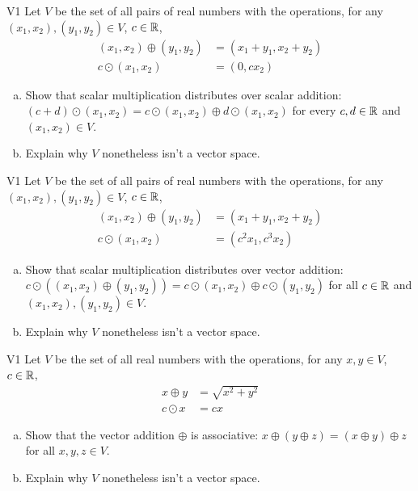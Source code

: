 \begin{problem}{V1}
Let \(V\) be the set of all pairs of real numbers with the operations, for any \((x_1,x_2), (y_1,y_2) \in V\), \(c\in \mathbb{R}\),
\begin{align*}
(x_1,x_2) \oplus (y_1,y_2) &= (x_1+y_1,x_2+y_2) \\
c \odot (x_1,x_2) &= (0, cx_2)
\end{align*}
\begin{enumerate}[(a)]
\item Show that scalar multiplication distributes over scalar addition:
      \((c+d)\odot(x_1,x_2)=c\odot(x_1,x_2) \oplus d\odot(x_1,x_2)\) for every \(c,d \in \mathbb{R}\) and \( (x_1,x_2) \in V\).
\item Explain why \(V\) nonetheless isn't a vector space.
\end{enumerate}
\end{problem}


 \begin{problem}{V1}
 Let \(V\) be the set of all pairs of real numbers with the operations, for any \((x_1,x_2), (y_1,y_2) \in V\), \(c\in \mathbb{R}\),
 \begin{align*}
 (x_1,x_2) \oplus (y_1,y_2) &= (x_1+y_1,x_2+y_2) \\
 c \odot (x_1,x_2) &= (c^2x_1, c^3x_2)
 \end{align*}
 \begin{enumerate}[(a)]
 \item Show that scalar multiplication distributes over vector addition:
       \(c\odot((x_1,x_2) \oplus (y_1,y_2))=c\odot(x_1,x_2) \oplus c\odot(y_1,y_2)\) for all \(c \in \mathbb{R}\) and \( (x_1,x_2), (y_1,y_2) \in V\).
\item Explain why \(V\) nonetheless isn't a vector space.
 \end{enumerate}
\end{problem}
 
\begin{problem}{V1}
 Let \(V\) be the set of all real numbers with the operations, for any \(x,y\in V\), \(c\in \mathbb{R}\),
 \begin{align*}
 x \oplus y &= \sqrt{x^2+y^2} \\
 c \odot x &= c x
 \end{align*}
 \begin{enumerate}[(a)]
 \item Show that the vector addition \(\oplus\) is associative:
       \(x \oplus (y \oplus z)=(x\oplus y)\oplus z\) for all \(x,y,z \in V\).
\item Explain why \(V\) nonetheless isn't a vector space.
 \end{enumerate}
 \end{problem}

